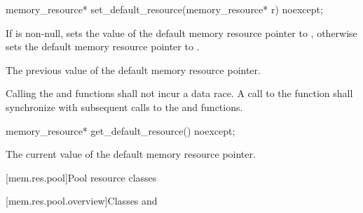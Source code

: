 %
\begin{itemdecl}
memory_resource* set_default_resource(memory_resource* r) noexcept;
\end{itemdecl}

\begin{itemdescr}
\pnum
\effects
If  is non-null,
sets the value of the default memory resource pointer to ,
otherwise sets the default memory resource pointer to .

\pnum
\returns
The previous value of the default memory resource pointer.

\pnum
\remarks
Calling the  and
 functions shall not incur a data race.
A call to the  function
shall synchronize with subsequent calls to
the  and  functions.
\end{itemdescr}

%
\begin{itemdecl}
memory_resource* get_default_resource() noexcept;
\end{itemdecl}

\begin{itemdescr}
\pnum
\returns
The current value of the default memory resource pointer.
\end{itemdescr}

[mem.res.pool]{Pool resource classes}

[mem.res.pool.overview]{Classes  and }

